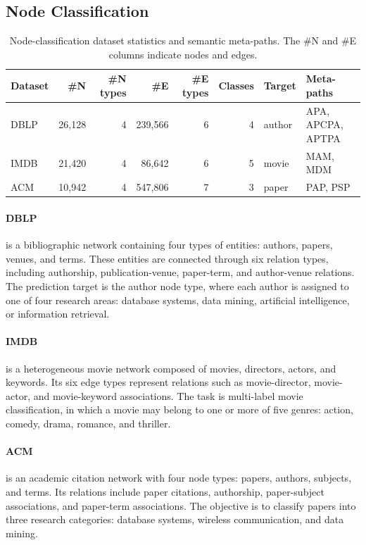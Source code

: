\documentclass[sigconf,anonymous,review]{acmart}
\begin{document}
\subsection{Node Classification}

\begin{table}[H]
  \centering
  \caption{Node-classification dataset statistics and semantic meta-paths. The \#N and
  \#E columns indicate nodes and edges.}
  \label{tab:node-datasets}
  \scriptsize
  \setlength{\tabcolsep}{2.5pt}
  \resizebox{\columnwidth}{!}
  {%
  \begin{tabular}{lrrrrrll}
    \toprule
    \textbf{Dataset} & \textbf{\#N} & \textbf{\#N types} & \textbf{\#E} &
    \textbf{\#E types} & \textbf{Classes} & \textbf{Target} & \textbf{Meta-paths} \\
    \midrule
    DBLP & 26{,}128 & 4 & 239{,}566 & 6 & 4 & author & APA, APCPA, APTPA \\
    IMDB & 21{,}420 & 4 & 86{,}642 & 6 & 5 & movie & MAM, MDM \\
    ACM & 10{,}942 & 4 & 547{,}806 & 7 & 3 & paper & PAP, PSP \\
    \bottomrule
  \end{tabular}%
  }
\end{table}

\paragraph{DBLP}
is a bibliographic network containing four types of entities: authors,
papers, venues, and terms. These entities are connected through six relation
types, including authorship, publication-venue, paper-term, and author-venue
relations. The prediction target is the author node type, where each author is
assigned to one of four research areas: database systems, data mining,
artificial intelligence, or information retrieval.

\paragraph{IMDB}
is a heterogeneous movie network composed of movies, directors, actors,
and keywords. Its six edge types represent relations such as movie-director,
movie-actor, and movie-keyword associations. The task is multi-label movie
classification, in which a movie may belong to one or more of five genres:
action, comedy, drama, romance, and thriller.

\paragraph{ACM}
is an academic citation network with four node types: papers, authors,
subjects, and terms. Its relations include paper citations, authorship,
paper-subject associations, and paper-term associations. The objective is to
classify papers into three research categories: database systems, wireless
communication, and data mining.
\end{document}
